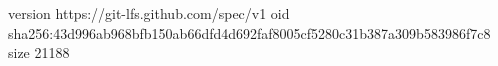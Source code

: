 version https://git-lfs.github.com/spec/v1
oid sha256:43d996ab968bfb150ab66dfd4d692faf8005cf5280c31b387a309b583986f7c8
size 21188
